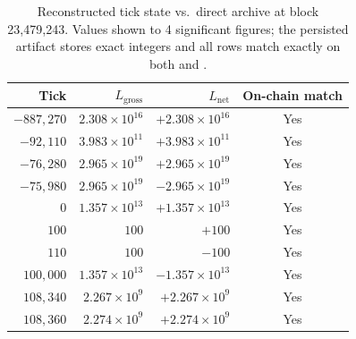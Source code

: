 \begin{table}[t]
    \centering
    \small
    \caption{Reconstructed tick state vs.\ direct archive \protect{} at block 23{,}479{,}243. Values shown to 4 significant figures; the persisted artifact stores exact integers and all rows match exactly on both \protect{} and \protect{}.}
    \label{tab:m1-ticks}
    \begin{tabular}{rrrc}
        \toprule
        Tick & $L_{\mathrm{gross}}$ & $L_{\mathrm{net}}$ & On-chain match \\
        \midrule
        $-887{,}270$ & $2.308{\times}10^{16}$ & $+2.308{\times}10^{16}$ & Yes \\
        $-92{,}110$  & $3.983{\times}10^{11}$ & $+3.983{\times}10^{11}$ & Yes \\
        $-76{,}280$  & $2.965{\times}10^{19}$ & $+2.965{\times}10^{19}$ & Yes \\
        $-75{,}980$  & $2.965{\times}10^{19}$ & $-2.965{\times}10^{19}$ & Yes \\
        $0$          & $1.357{\times}10^{13}$ & $+1.357{\times}10^{13}$ & Yes \\
        $100$        & $100$                  & $+100$                  & Yes \\
        $110$        & $100$                  & $-100$                  & Yes \\
        $100{,}000$  & $1.357{\times}10^{13}$ & $-1.357{\times}10^{13}$ & Yes \\
        $108{,}340$  & $2.267{\times}10^{9}$  & $+2.267{\times}10^{9}$  & Yes \\
        $108{,}360$  & $2.274{\times}10^{9}$  & $+2.274{\times}10^{9}$  & Yes \\
        \bottomrule
    \end{tabular}
\end{table}

